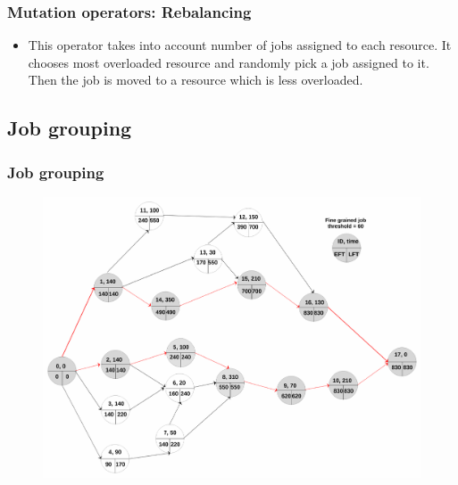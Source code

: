 \documentclass{beamer}
\begin{document}
\begin{frame}
\frametitle{Mutation operators: Rebalancing}
\begin{itemize}
 \item This operator takes into account number of jobs assigned to each resource. It chooses most overloaded resource and randomly pick a job assigned to it. Then the job is moved to a resource which is less overloaded.
\end{itemize}
\end{frame}

\subsection*{Job grouping}
\begin{frame}[label=jbgrpimg]
\frametitle{Job grouping \hyperlink{jbgrp}{}}
\begin{figure}[h]
    \centering
    \includegraphics[height=0.77\textheight,width=\textwidth]{imgs/jobgrouping}
\end{figure}
\end{frame}
\end{document}
